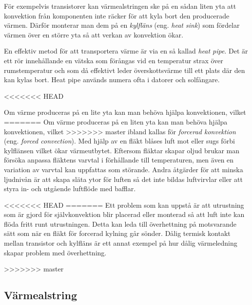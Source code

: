 För exempelvis transistorer kan värmealstringen ske på en sådan liten yta att
konvektion från komponenten inte räcker för att kyla bort den producerade
värmen. Därför monterar man dem på en \emph{kylfläns} (eng.
\emph{heat sink}) som fördelar värmen över en större yta så att verkan av
konvektion ökar.

En effektiv metod för att transportera värme är via en så kallad \emph{heat pipe}.
Det är ett rör innehållande en vätska som förångas vid en temperatur strax över
rumstemperatur och som då effektivt leder överskottsvärme till ett plats där den kan
kylas bort. Heat pipe används numera ofta i datorer och solfångare.

<<<<<<< HEAD

Om värme produceras på en lite yta kan man behöva hjälpa konvektionen, vilket
=======
Om värme produceras på en liten yta kan man behöva hjälpa konvektionen, vilket
>>>>>>> master
ibland kallas för \emph{forcerad konvektion} (eng. \emph{forced convection}).
Med hjälp av en fläkt blåses luft mot eller sugs förbi kylflänsen vilket ökar
värmeutbytet. Eftersom fläktar skapar oljud brukar man försöka anpassa
fläktens varvtal i förhållande till temperaturen, men även en variation av
varvtal kan uppfattas som störande. Andra åtgärder för att minska ljudnivån
är att skapa släta ytor för luften så det inte bildas luftvirvlar eller att 
styra in- och utgående luftflöde med bafflar.

<<<<<<< HEAD
=======
Ett problem som kan uppstå är att utrustning som är gjord för självkonvektion
blir placerad eller monterad så att luft inte kan flöda fritt runt
utrustningen. Detta kan leda till överhettning på motsvarande sätt som när
en fläkt för forcerad kylning går sönder. Dålig termisk kontakt mellan
transistor och kylfläns är ett annat exempel på hur dålig värmeledning skapar
problem med överhettning.

>>>>>>> master
\subsection{Värmealstring}

